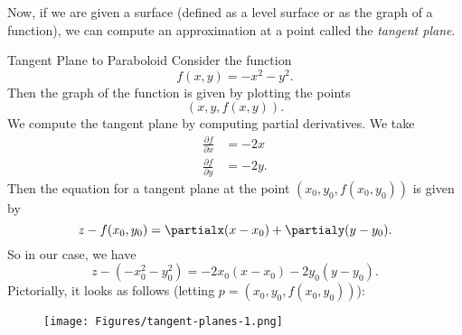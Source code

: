         Now, if we are given a surface (defined as a level surface or as the graph of a function), we can compute an approximation at a point called the \emph{tangent plane}.
        
        \begin{ex}{Tangent Plane to Paraboloid}
        Consider the function 
        \[
        f(x,y)=-x^2-y^2.
        \]
        Then the graph of the function is given by plotting the points
        \[
        (x,y,f(x,y)).
        \]
        We compute the tangent plane by computing partial derivatives. We take
        \begin{align*}
        \frac{\partial f}{\partial x} &= -2x\\    
        \frac{\partial f}{\partial y} &= -2y.
        \end{align*}
        Then the equation for a tangent plane at the point $(x_0,y_0,f(x_0,y_0))$ is given by
        \[
        z-f(x_0,y_0)=\partialx (x-x_0)+\partialy (y-y_0).
        \]
        So in our case, we have
        \[
        z-(-x_0^2-y_0^2)=-2x_0(x-x_0)-2y_0(y-y_0).
        \]
        Pictorially, it looks as follows (letting $p=(x_0,y_0,f(x_0,y_0))$):
        \begin{figure}[H]
            \centering
            \texttt{[image: Figures/tangent-planes-1.png]}
        \end{figure}
                
        \end{ex}
        
